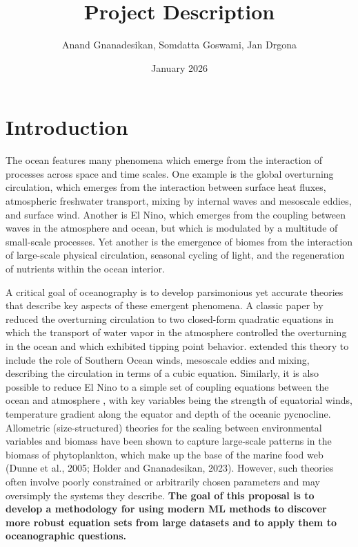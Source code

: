 \documentclass{article}
\title{Project Description}
\author{Anand Gnanadesikan, Somdatta Goswami, Jan Drgona}
\date{January 2026}
\begin{document}
\section{Introduction}

The ocean features many phenomena which emerge from the interaction of processes across space and time scales. One example is the global overturning circulation, which emerges from the interaction between surface heat fluxes, atmospheric freshwater transport, mixing by internal waves and mesoscale eddies, and surface wind. Another is  El Nino, which emerges from the coupling between waves in the atmosphere and ocean, but which is modulated by a multitude of small-scale processes. Yet another is the emergence of biomes from the interaction of large-scale physical circulation, seasonal cycling of light, and the regeneration of nutrients within the ocean interior. 

A critical goal of oceanography is to develop parsimonious yet accurate theories that describe key aspects of these emergent phenomena. A classic paper by \citep{stommel1961thermohaline} reduced the overturning circulation to two closed-form quadratic equations in which the transport of water vapor in the atmosphere controlled the overturning in the ocean and which exhibited tipping point behavior. \cite{gnanadesikan1999simple}  extended this theory to include the role of Southern Ocean winds, mesoscale eddies and mixing, describing the circulation in terms of a cubic equation. Similarly, it is also possible to reduce El Nino to a simple set of coupling equations between the ocean and atmosphere \citep{vallis1986nino} , with key variables being the strength of equatorial winds, temperature gradient along the equator and depth of the oceanic pycnocline.  Allometric (size-structured) theories for the scaling between environmental variables and biomass have been shown to capture large-scale patterns in the biomass of phytoplankton, which make up the base of the marine food web (Dunne et al., 2005; Holder and Gnanadesikan, 2023). However, such theories often involve poorly constrained or arbitrarily chosen parameters and may oversimply the systems they describe. {\bf The goal of this proposal is to develop a methodology for using modern ML methods to discover more robust equation sets from large datasets and to apply them to oceanographic questions.}  
\end{document}
